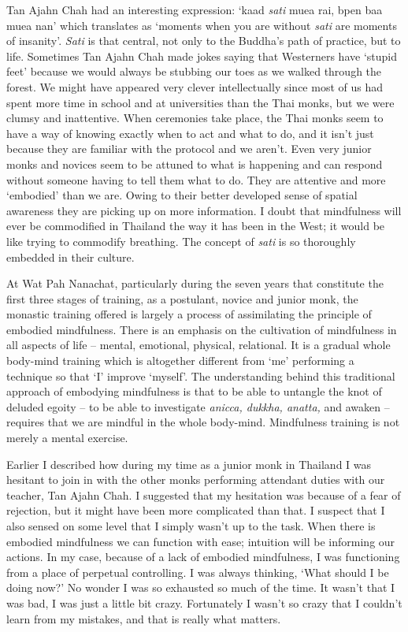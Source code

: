 Tan Ajahn Chah had an interesting expression: `kaad \emph{sati} muea rai,
bpen baa muea nan' which translates as `moments when you are without
\emph{sati} are moments of insanity'. \emph{Sati} is that central, not only to the
Buddha's path of practice, but to life. Sometimes Tan Ajahn Chah made
jokes saying that Westerners have `stupid feet' because we would always
be stubbing our toes as we walked through the forest. We might have
appeared very clever intellectually since most of us had spent more time
in school and at universities than the Thai monks, but we were clumsy
and inattentive. When ceremonies take place, the Thai monks seem to have
a way of knowing exactly when to act and what to do, and it isn't just
because they are familiar with the protocol and we aren't. Even very
junior monks and novices seem to be attuned to what is happening and can
respond without someone having to tell them what to do. They are
attentive and more `embodied' than we are. Owing to their better
developed sense of spatial awareness they are picking up on more
information. I doubt that mindfulness will ever be commodified in
Thailand the way it has been in the West; it would be like trying to
commodify breathing. The concept of \emph{sati} is so thoroughly embedded in
their culture.

At Wat Pah Nanachat, particularly during the seven years that constitute
the first three stages of training, as a postulant, novice and junior
monk, the monastic training offered is largely a process of assimilating
the principle of embodied mindfulness. There is an emphasis on the
cultivation of mindfulness in all aspects of life -- mental, emotional,
physical, relational. It is a gradual whole body-mind training which is
altogether different from `me' performing a technique so that `I'
improve `myself'. The understanding behind this traditional approach of
embodying mindfulness is that to be able to untangle the knot of deluded
egoity -- to be able to investigate \emph{anicca, dukkha, anatta,} and awaken
-- requires that we are mindful in the whole body-mind. Mindfulness
training is not merely a mental exercise.

Earlier I described how during my time as a junior monk in Thailand I
was hesitant to join in with the other monks performing attendant duties
with our teacher, Tan Ajahn Chah. I suggested that my hesitation was
because of a fear of rejection, but it might have been more complicated
than that. I suspect that I also sensed on some level that I simply
wasn't up to the task. When there is embodied mindfulness we can
function with ease; intuition will be informing our actions. In my case,
because of a lack of embodied mindfulness, I was functioning from a
place of perpetual controlling. I was always thinking, `What should I be
doing now?' No wonder I was so exhausted so much of the time. It wasn't
that I was bad, I was just a little bit crazy. Fortunately I wasn't so
crazy that I couldn't learn from my mistakes, and that is really what
matters.

